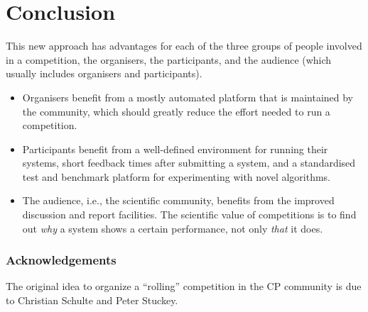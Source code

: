\section{Conclusion}
\label{sec:conclusion}


This new approach has advantages for each of the three groups of
people involved in a competition, the organisers, the participants,
and the audience (which usually includes organisers and
participants). 

\begin{itemize}
  \item Organisers benefit from a mostly automated platform that is maintained by the community, which should greatly reduce the effort needed to run a competition.
  \item Participants benefit from a well-defined environment for running their systems, short feedback times after submitting a system, and a standardised test and benchmark platform for experimenting with novel algorithms.
  \item The audience, i.e., the scientific community, benefits from the improved discussion and report facilities. The scientific value of competitions is to find out \emph{why} a system shows a certain performance, not only \emph{that} it does.
\end{itemize}




\subsubsection*{Acknowledgements}
The original idea to organize a ``rolling'' competition in the CP community is due to Christian Schulte and Peter Stuckey.




